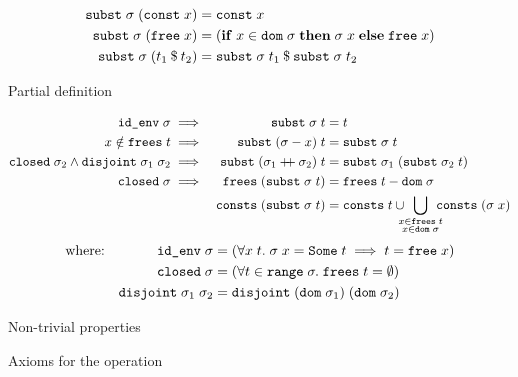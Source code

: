 \begin{code}[t]
  \setlength{\belowdisplayskip}{5pt}
  \setlength{\belowdisplayshortskip}{5pt}
  \begin{subcode}{\linewidth}
    \begin{align*}
      \texttt{\textup{subst}}\;\sigma\;(\texttt{\textup{const}}\;x) &= \texttt{\textup{const}}\;x \\
      \texttt{\textup{subst}}\;\sigma\;(\texttt{\textup{free}}\;x) &= (\mathtt{\mathbf{if}}\;x \in \texttt{\textup{dom}}\;\sigma\;\mathtt{\mathbf{then}}\;\sigma\;x\;\mathtt{\mathbf{else}}\;\texttt{\textup{free}}\;x) \\
      \texttt{\textup{subst}}\;\sigma\;(t_1\mathbin{\$}t_2) &= \texttt{\textup{subst}}\;\sigma\;t_1\mathbin{\$}\texttt{\textup{subst}}\;\sigma\;t_2
    \end{align*}
    \caption{Partial definition}
    \label{code:terms:algebra:subst:def}
  \end{subcode}

  \begin{subcode}{\linewidth}
    \begin{align}
      \holconst{id\_env}\;\sigma &\implies&\holconst{subst}\;\sigma\;t &= t
      \label{thm:terms:algebra:subst-id} \\
      x \notin \holconst{frees}\;t &\implies& \holconst{subst}\;(\sigma - x)\;t &= \holconst{subst}\;\sigma\;t
      \label{thm:terms:algebra:subst-drop} \\
      \holconst{closed}\;\sigma_2 \wedge \holconst{disjoint}\;\sigma_1\;\sigma_2 &\implies& \holconst{subst}\;(\envadd{\sigma_1}{\sigma_2})\;t &= \holconst{subst}\;\sigma_1\;(\holconst{subst}\;\sigma_2\;t)
      \label{thm:terms:algebra:subst-twice} \\
      \holconst{closed}\;\sigma &\implies& \holconst{frees}\;(\holconst{subst}\;\sigma\;t) &= \holconst{frees}\;t - \holconst{dom}\;\sigma
      \label{thm:terms:algebra:subst-vars} \\
      &&\holconst{consts}\;(\holconst{subst}\;\sigma\;t) &= \holconst{consts}\;t \cup \!\!\!\! \bigcup\limits_{\substack{x \in \holconst{frees}\;t \\ x \in \holconst{dom}\;\sigma}} \!\!\!\! \holconst{consts}\;(\sigma\;x)
      \label{thm:terms:algebra:subst-consts}
    \end{align}
    \setlength{\abovedisplayskip}{0pt}
    \setlength{\abovedisplayshortskip}{0pt}
    \begin{align*}
      \text{where:} &&\texttt{\textup{id\_env}}\;\sigma &= (\forall x\;t.\;\sigma\;x = \texttt{\textup{Some}}\;t \implies t = \texttt{\textup{free}}\;x) \\
      &&\texttt{\textup{closed}}\;\sigma &= (\forall t \in \texttt{\textup{range}}\;\sigma.\;\texttt{\textup{frees}}\;t = \emptyset) \\
      &&\texttt{\textup{disjoint}}\;\sigma_1\;\sigma_2 &= \texttt{\textup{disjoint}}\;(\texttt{\textup{dom}}\;\sigma_1)\;(\texttt{\textup{dom}}\;\sigma_2)
    \end{align*}
    \caption{Non-trivial properties}
    \label{code:terms:algebra:subst:props}
  \end{subcode}
  \caption{Axioms for the  operation}
  \label{code:terms:algebra:subst}
\end{code}

